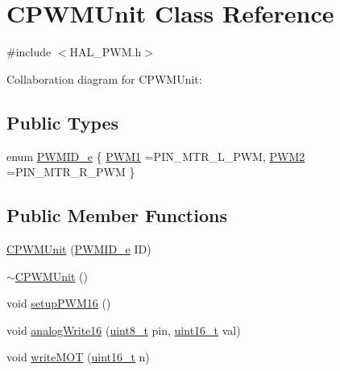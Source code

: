 \hypertarget{class_c_p_w_m_unit}{}\section{C\+P\+W\+M\+Unit Class Reference}
\label{class_c_p_w_m_unit}


{\ttfamily \#include $<$H\+A\+L\+\_\+\+P\+W\+M.\+h$>$}



Collaboration diagram for C\+P\+W\+M\+Unit\+:
\subsection*{Public Types}
\begin{DoxyCompactItemize}
\item 
enum \mbox{\hyperlink{class_c_p_w_m_unit_ad3e55d1df0367d8a090d4b835704be44}{P\+W\+M\+I\+D\+\_\+e}} \{ \mbox{\hyperlink{class_c_p_w_m_unit_ad3e55d1df0367d8a090d4b835704be44a3f6167a7882e80f1ad05c8bff5e538c0}{P\+W\+M1}} =P\+I\+N\+\_\+\+M\+T\+R\+\_\+\+L\+\_\+\+P\+WM, 
\mbox{\hyperlink{class_c_p_w_m_unit_ad3e55d1df0367d8a090d4b835704be44afc7888ea63be5da5551d10db3d676185}{P\+W\+M2}} =P\+I\+N\+\_\+\+M\+T\+R\+\_\+\+R\+\_\+\+P\+WM
 \}
\end{DoxyCompactItemize}
\subsection*{Public Member Functions}
\begin{DoxyCompactItemize}
\item 
\mbox{\hyperlink{class_c_p_w_m_unit_a9e68713e9f26f6d36714a58648494afb}{C\+P\+W\+M\+Unit}} (\mbox{\hyperlink{class_c_p_w_m_unit_ad3e55d1df0367d8a090d4b835704be44}{P\+W\+M\+I\+D\+\_\+e}} ID)
\item 
\mbox{\hyperlink{class_c_p_w_m_unit_aabfa153a1f1019befa096147428a3822}{$\sim$\+C\+P\+W\+M\+Unit}} ()
\item 
void \mbox{\hyperlink{class_c_p_w_m_unit_a706f0f6235cbd5e71f8bada09cfcea74}{setup\+P\+W\+M16}} ()
\item 
void \mbox{\hyperlink{class_c_p_w_m_unit_ab58a9dc2ba40062af2f4fea88e3148aa}{analog\+Write16}} (\mbox{\hyperlink{_a_d_a_s___types_8h_aba7bc1797add20fe3efdf37ced1182c5}{uint8\+\_\+t}} pin, \mbox{\hyperlink{_a_d_a_s___types_8h_a1f1825b69244eb3ad2c7165ddc99c956}{uint16\+\_\+t}} val)
\item 
void \mbox{\hyperlink{class_c_p_w_m_unit_a71e701a722052129016d8efddbb34d76}{write\+M\+OT}} (\mbox{\hyperlink{_a_d_a_s___types_8h_a1f1825b69244eb3ad2c7165ddc99c956}{uint16\+\_\+t}} n)
\end{DoxyCompactItemize}


